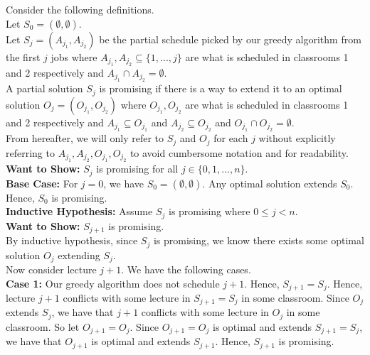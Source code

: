 \documentclass[12pt]{article}
\begin{document}
Consider the following definitions. \\

Let $S_0 = (\emptyset, \emptyset)$. \\

Let $S_j = (A_{j_1}, A_{j_2})$ be the partial schedule picked by our greedy algorithm from the first $j$ jobs where $A_{j_1}, A_{j_2} \subseteq \{1,...,j\}$ are what is scheduled in classrooms 1 and 2 respectively and $A_{j_1} \cap A_{j_2} = \emptyset$. \\

A partial solution $S_j$ is promising if there is a way to extend it to an optimal solution $O_j = (O_{j_1}, O_{j_2})$ where $O_{j_1}, O_{j_2}$ are what is scheduled in classrooms 1 and 2 respectively and $A_{j_1} \subseteq O_{j_1}$ and $A_{j_2} \subseteq O_{j_2}$ and $O_{j_1} \cap O_{j_2} = \emptyset$. \\

From hereafter, we will only refer to $S_j$ and $O_j$ for each $j$ without explicitly referring to $A_{j_1}, A_{j_2}, O_{j_1}, O_{j_2}$ to avoid cumbersome notation and for readability. \\

\textbf{Want to Show:} $S_j$ is promising for all $j \in \{0,1,...,n\}$. \\

\textbf{Base Case:} For $j = 0$, we have $S_0 = (\emptyset, \emptyset)$. Any optimal solution extends $S_0$. Hence, $S_0$ is promising. \\

\textbf{Inductive Hypothesis:} Assume $S_j$ is promising where $0 \leq j < n$. \\

\textbf{Want to Show:} $S_{j+1}$ is promising. \\

By inductive hypothesis, since $S_j$ is promising, we know there exists some optimal solution $O_j$ extending $S_j$. \\

Now consider lecture $j + 1$. We have the following cases. \\

\textbf{Case 1:} Our greedy algorithm does not schedule $j+1$. Hence, $S_{j+1} = S_j$. Hence, lecture $j+1$ conflicts with some lecture in $S_{j+1} = S_j$ in some classroom. Since $O_j$ extends $S_j$, we have that $j+1$ conflicts with some lecture in $O_j$ in some classroom. So let $O_{j+1} = O_j$. Since $O_{j+1} = O_j$ is optimal and extends $S_{j+1} = S_j$, we have that $O_{j+1}$ is optimal and extends $S_{j+1}$. Hence, $S_{j+1}$ is promising. \\
\end{document}
